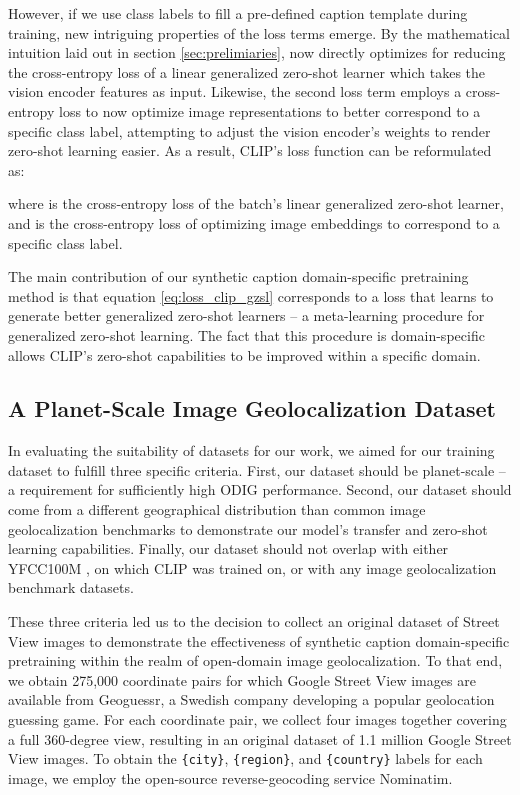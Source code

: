 \documentclass{article}
\renewcommand{\cite}[1]{\citep{#1}}
\begin{document}
However, if we use class labels to fill a pre-defined caption template during training, new intriguing properties of the loss terms emerge. By the mathematical intuition laid out in section \ref{sec:prelimiaries},  now directly optimizes for reducing the cross-entropy loss of a linear generalized zero-shot learner which takes the vision encoder features as input. Likewise, the second loss term  employs a cross-entropy loss to now optimize image representations to better correspond to a specific class label, attempting to adjust the vision encoder's weights to render zero-shot learning easier. As a result, CLIP's loss function can be reformulated as:



where  is the cross-entropy loss of the batch's linear generalized zero-shot learner, and  is the cross-entropy loss of optimizing image embeddings to correspond to a specific class label.

The main contribution of our synthetic caption domain-specific pretraining method is that equation \ref{eq:loss_clip_gzsl} corresponds to a loss that learns to generate better generalized zero-shot learners – a meta-learning procedure for generalized zero-shot learning. The fact that this procedure is domain-specific allows CLIP's zero-shot capabilities to be improved within a specific domain.

\subsection{A Planet-Scale Image Geolocalization Dataset}
\label{sec:datasetours}

In evaluating the suitability of datasets for our work, we aimed for our training dataset to fulfill three specific criteria. First, our dataset should be planet-scale – a requirement for sufficiently high ODIG performance. Second, our dataset should come from a different geographical distribution than common image geolocalization benchmarks to demonstrate our model's transfer and zero-shot learning capabilities. Finally, our dataset should not overlap with either YFCC100M \cite{thomee_2016}, on which CLIP \cite{radford21a} was trained on, or with any image geolocalization benchmark datasets.

These three criteria led us to the decision to collect an original dataset of Street View images to demonstrate the effectiveness of synthetic caption domain-specific pretraining within the realm of open-domain image geolocalization. To that end, we obtain 275,000 coordinate pairs for which Google Street View images are available from Geoguessr, a Swedish company developing a popular geolocation guessing game. For each coordinate pair, we collect four images together covering a full 360-degree view, resulting in an original dataset of 1.1 million Google Street View images. To obtain the \texttt{\{city\}}, \texttt{\{region\}}, and \texttt{\{country\}} labels for each image, we employ the open-source reverse-geocoding service Nominatim.
\end{document}
